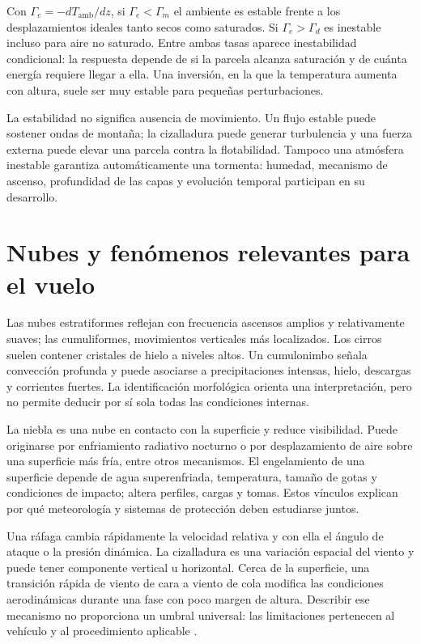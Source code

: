 Con $\Gamma_e=-dT_{\mathrm{amb}}/dz$, si $\Gamma_e<\Gamma_m$ el ambiente es estable frente a los desplazamientos ideales tanto secos como saturados. Si $\Gamma_e>\Gamma_d$ es inestable incluso para aire no saturado. Entre ambas tasas aparece inestabilidad condicional: la respuesta depende de si la parcela alcanza saturación y de cuánta energía requiere llegar a ella. Una inversión, en la que la temperatura aumenta con altura, suele ser muy estable para pequeñas perturbaciones.

La estabilidad no significa ausencia de movimiento. Un flujo estable puede sostener ondas de montaña; la cizalladura puede generar turbulencia y una fuerza externa puede elevar una parcela contra la flotabilidad. Tampoco una atmósfera inestable garantiza automáticamente una tormenta: humedad, mecanismo de ascenso, profundidad de las capas y evolución temporal participan en su desarrollo.

\section{Nubes y fenómenos relevantes para el vuelo}
Las nubes estratiformes reflejan con frecuencia ascensos amplios y relativamente suaves; las cumuliformes, movimientos verticales más localizados. Los cirros suelen contener cristales de hielo a niveles altos. Un cumulonimbo señala convección profunda y puede asociarse a precipitaciones intensas, hielo, descargas y corrientes fuertes. La identificación morfológica orienta una interpretación, pero no permite deducir por sí sola todas las condiciones internas.

La niebla es una nube en contacto con la superficie y reduce visibilidad. Puede originarse por enfriamiento radiativo nocturno o por desplazamiento de aire sobre una superficie más fría, entre otros mecanismos. El engelamiento de una superficie depende de agua superenfriada, temperatura, tamaño de gotas y condiciones de impacto; altera perfiles, cargas y tomas. Estos vínculos explican por qué meteorología y sistemas de protección deben estudiarse juntos.

Una ráfaga cambia rápidamente la velocidad relativa y con ella el ángulo de ataque o la presión dinámica. La cizalladura es una variación espacial del viento y puede tener componente vertical u horizontal. Cerca de la superficie, una transición rápida de viento de cara a viento de cola modifica las condiciones aerodinámicas durante una fase con poco margen de altura. Describir ese mecanismo no proporciona un umbral universal: las limitaciones pertenecen al vehículo y al procedimiento aplicable \cite{PHAK}.

